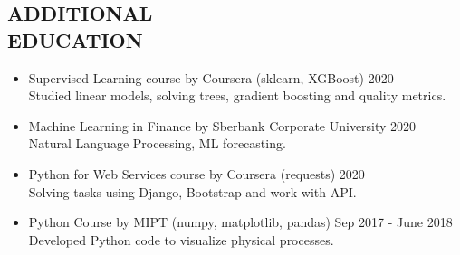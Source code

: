 \documentclass[margin, 10pt]{res} %
\begin{document}
\begin{resume}
%
 
\section{ADDITIONAL \\ EDUCATION}

\begin{itemize}
\item Supervised Learning course by Coursera (sklearn, XGBoost) \hfill 2020 \\
Studied linear models, solving trees, gradient boosting and quality metrics.

\item Machine Learning in Finance by Sberbank Corporate University \hfill 2020 \\
Natural Language Processing, ML forecasting.

\item Python for Web Services course by Coursera (requests) \hfill 2020  \\
Solving tasks using Django, Bootstrap and work with API.

\item Python Course by MIPT (numpy, matplotlib, pandas) \hfill Sep 2017 - June 2018 \\
Developed Python code to visualize physical processes.

\end{itemize} 




\end{resume}
\end{document}

